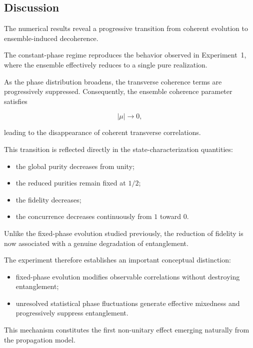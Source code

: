 
\subsection*{Discussion}

The numerical results reveal a progressive transition from coherent evolution to ensemble-induced decoherence.

The constant-phase regime reproduces the behavior observed in Experiment~1, where the ensemble effectively reduces to a single pure realization.

As the phase distribution broadens, the transverse coherence terms are progressively suppressed. Consequently, the ensemble coherence parameter satisfies

\[
|\mu|
\rightarrow
0,
\]

leading to the disappearance of coherent transverse correlations.

This transition is reflected directly in the state-characterization quantities:

\begin{itemize}
    \item the global purity decreases from unity;
    \item the reduced purities remain fixed at \(1/2\);
    \item the fidelity decreases;
    \item the concurrence decreases continuously from \(1\) toward \(0\).
\end{itemize}

Unlike the fixed-phase evolution studied previously, the reduction of fidelity is now associated with a genuine degradation of entanglement.

The experiment therefore establishes an important conceptual distinction:

\begin{itemize}
    \item fixed-phase evolution modifies observable correlations without destroying entanglement;
    \item unresolved statistical phase fluctuations generate effective mixedness and progressively suppress entanglement.
\end{itemize}

This mechanism constitutes the first non-unitary effect emerging naturally from the propagation model.

